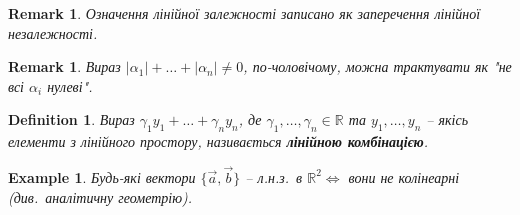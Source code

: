 \documentclass[a4paper, 10pt]{article}
\theoremstyle{theoremdd}
\newtheorem{definition}[theorem]{Definition}
\newtheorem{example}[theorem]{Example}
\newtheorem{remark}[theorem]{Remark}
\begin{document}
	\begin{remark}
	Означення лінійної залежності записано як заперечення лінійної незалежності.
	\end{remark}
	
	\begin{remark}
	Вираз $|\alpha_1| + \dots + |\alpha_n| \ne 0$, по-чоловічому, можна трактувати як "не всі $\alpha_i$ нулеві".
	\end{remark}
	
	\begin{definition}
	Вираз $\gamma_1 y_1 + \dots + \gamma_n y_n$, де $\gamma_1, \dots, \gamma_n \in \mathbb{R}$ та $y_1,\dots,y_n$ -- якісь елементи з лінійного простору, називається \textbf{лінійною комбінацією}.
	\end{definition}
	
	\begin{example}
	Будь-які вектори $\{\vec{a}, \vec{b} \}$ -- л.н.з.\ в $\mathbb{R}^2 \iff $ вони не колінеарні (див.\ аналітичну геометрію).
	\end{example}
	
\end{document}
